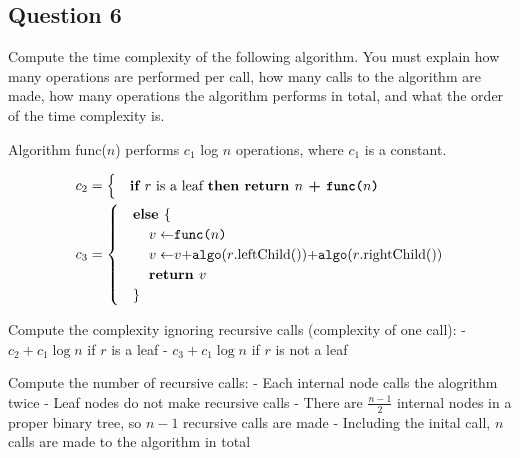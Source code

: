 \documentclass[12pt]{article}
\begin{document}
\subsection*{Question 6}

Compute the time complexity of the following algorithm. You must explain how many
operations are performed per call, how many calls to the algorithm are made, how many operations
the algorithm performs in total, and what the order of the time complexity is.

Algorithm func($n$) performs $c_1$ log $n$ operations, where $c_1$ is a constant.

\begin{align*}
    &c_2=
    \begin{cases}
    &\textbf{if $r$}\textnormal{ is a leaf }\textbf{then return $n$ + \texttt{func($n$)}}\\
    \end{cases}\\
    &c_3=
    \begin{cases}
    &\textbf{else \textnormal{\{}}\\
    &\textnormal{\hspace*{4mm}$v\leftarrow$\texttt{func($n$)}}\\
    &\textnormal{\hspace*{4mm}$v\leftarrow$$v+$\texttt{algo}\textnormal{($r$.leftChild())$+$}\texttt{algo}\textnormal{($r$.rightChild())}}\\
    &\hspace*{4mm}\textbf{return $v$}\\
    &\text{\}}\\
    \end{cases}
\end{align*}

\pagebreak

Compute the complexity ignoring recursive calls (complexity of one call):\newline
- $c_2+c_1\log n$ if $r$ is a leaf\newline
- $c_3+c_1\log n$ if $r$ is not a leaf

Compute the number of recursive calls:\newline
- Each internal node calls the alogrithm twice\newline
- Leaf nodes do not make recursive calls\newline
- There are $\frac{n-1}{2}$ internal nodes in a proper binary tree, so $n-1$ recursive calls are made\newline
- Including the inital call, $n$ calls are made to the algorithm in total
\end{document}
